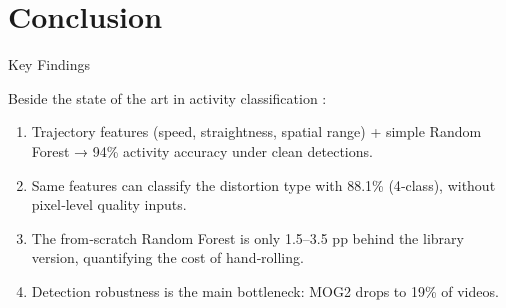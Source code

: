 \documentclass[compress,aspectratio=169]{beamer}
\begin{document}
\section{Conclusion}

\begin{frame}{Key Findings}
  
  Beside the state of the art in activity classification :


  \begin{enumerate}
    \item Trajectory features (speed, straightness, spatial range) + simple Random Forest → \alert{94\% activity accuracy} under clean detections.
    \item Same features can classify the \alert{distortion type} with 88.1\% (4‑class), without pixel‑level quality inputs.
    \item The \alert{from‑scratch Random Forest} is only 1.5–3.5 pp behind the library version, quantifying the cost of hand‑rolling.
    \item Detection robustness is the \alert{main bottleneck}: MOG2 drops to 19\% of videos.
  \end{enumerate}
\end{frame}
\end{document}
